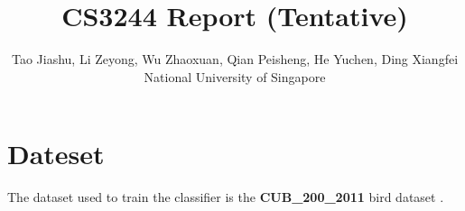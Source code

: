 \documentclass[letterpaper, 12pt]{article}
\title{CS3244 Report (Tentative)}
\author{Tao Jiashu, Li Zeyong, Wu Zhaoxuan, Qian Peisheng, He Yuchen, Ding Xiangfei\\
National University of Singapore}
\date{}
\begin{document}
\maketitle

\section{Dateset}
The dataset used to train the classifier is the \textbf{CUB\_200\_2011}
bird dataset \cite{WahCUB_200_2011}.



\end{document}
